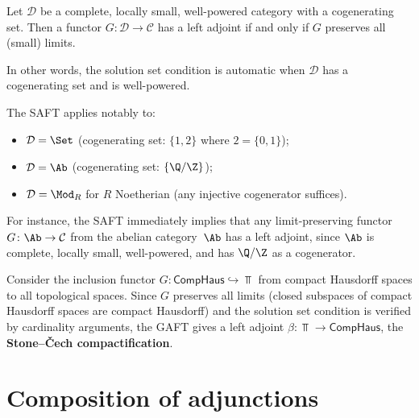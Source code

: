 \begin{theorem}%
\label{thm:SAFT}
Let $\mathcal{D}$ be a complete, locally small, well-powered
category with a cogenerating set.
Then a functor $G\colon\mathcal{D}\to\mathcal{C}$ has a left
adjoint if and only if $G$ preserves all (small) limits.
\end{theorem}

In other words, the solution set condition is automatic when $\mathcal{D}$
has a cogenerating set and is well-powered.

\begin{remark}\label{rem:SAFT-applications}
The SAFT applies notably to:
\begin{itemize}
\item $\mathcal{D} = \Set$ (cogenerating set: $\{1, 2\}$ where
      $2 = \{0,1\}$);
\item $\mathcal{D} = \Ab$ (cogenerating set: $\{\Q/\Z\}$);
\item $\mathcal{D} = \Mod_R$ for $R$ Noetherian
      (any injective cogenerator suffices).
\end{itemize}
For instance, the SAFT immediately implies that any limit-preserving
functor $G\colon\Ab\to\mathcal{C}$ from the abelian category~$\Ab$
has a left adjoint, since $\Ab$ is complete, locally small,
well-powered, and has $\Q/\Z$ as a cogenerator.
\end{remark}

\begin{example}\label{ex:GAFT-application}
Consider the inclusion functor $G\colon\mathsf{CompHaus}\hookrightarrow\Top$
from compact Hausdorff spaces to all topological spaces.
Since $G$ preserves all limits (closed subspaces of compact Hausdorff
spaces are compact Hausdorff) and the solution set condition is verified
by cardinality arguments, the GAFT gives a left adjoint
$\beta\colon\Top\to\mathsf{CompHaus}$, the
\textbf{Stone--\v{C}ech compactification}.
\end{example}


\section{Composition of adjunctions}\label{sec:adj-composition}

